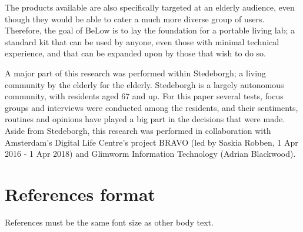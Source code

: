 \documentclass{below-ext}
\begin{document}
The products available are also specifically targeted at an elderly audience, even though they would be able to cater a much more diverse group of users. Therefore, the goal of BeLow is to lay the foundation for a portable living lab; a standard kit that can be used by anyone, even those with minimal technical experience, and that can be expanded upon by those that wish to do so.

A major part of this research was performed within Stedeborgh; a living community by the elderly for the elderly. Stedeborgh is a largely autonomous community, with residents aged 67 and up. For this paper several tests, focus groups and interviews were conducted among the residents, and their sentiments, routines and opinions have played a big part in the decisions that were made. Aside from Stedeborgh, this research was performed in collaboration with Amsterdam's Digital Life Centre's project BRAVO (led by Saskia Robben, 1 Apr 2016 - 1 Apr 2018) and Glimworm Information Technology (Adrian Blackwood). 





\section{References format}
References must be the same font size as other body text.

\balance


\end{document}

